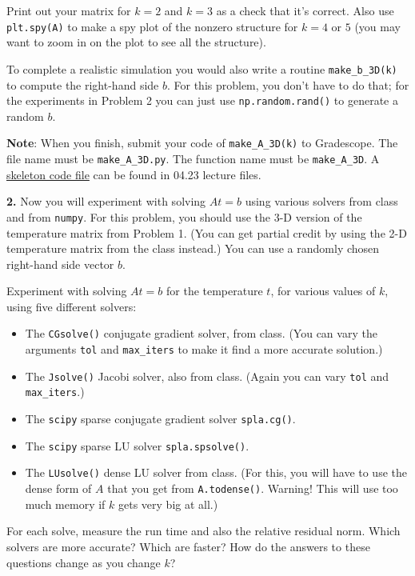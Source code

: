 \documentclass[11pt]{article}
\begin{document}
Print out your matrix for $k=2$ and $k=3$ as a check that it's correct. 
Also use {\tt plt.spy(A)} to make a spy plot of the nonzero structure 
for $k=4$ or $5$ (you may want to zoom in on the plot to see all the structure).

To complete a realistic simulation you would also 
write a routine {\tt make\_b\_3D(k)} to compute the right-hand side $b$.
For this problem, you don't have to do that; 
for the experiments in Problem 2 you can just use {\tt np.random.rand()}
to generate a random $b$.

{\bf Note}:
When you finish, submit your code of {\tt make\_A\_3D(k)} to Gradescope.
The file name must be {\tt make\_A\_3D.py}.
The function name must be {\tt make\_A\_3D}.
A \href{https://github.com/ucsb-cs111/s19-lecture-files/blob/master/04.23/make_A_3D.py}
{skeleton code file} can be found in 04.23 lecture files.


\par\bigskip
{\bf 2.} 
Now you will experiment with solving $At=b$ using various solvers
from class and from {\tt numpy}.
For this problem, you should use the 3-D version of the temperature matrix
from Problem 1. 
(You can get partial credit by using the 2-D temperature matrix from the
class instead.)
You can use a randomly chosen right-hand side vector $b$.

Experiment with solving $At=b$ for the temperature $t$, 
for various values of $k$, using five different solvers:
\begin{itemize}
\item The {\tt CGsolve()} conjugate gradient solver, from class.
(You can vary the arguments {\tt tol} and {\tt max\_iters} to
make it find a more accurate solution.)
\item The {\tt Jsolve()} Jacobi solver, also from class.
(Again you can vary {\tt tol} and {\tt max\_iters}.)
\item The {\tt scipy} sparse conjugate gradient solver {\tt spla.cg()}.
\item The {\tt scipy} sparse LU solver {\tt spla.spsolve()}.
\item The {\tt LUsolve()} dense LU solver from class.
(For this, you will have to use the dense form of $A$ that you get
from {\tt A.todense()}. Warning! This will use too much memory if
$k$ gets very big at all.)
\end{itemize}
For each solve, measure the run time and also the relative residual norm.
Which solvers are more accurate? Which are faster? How do the
answers to these questions change as you change $k$?
\end{document}
